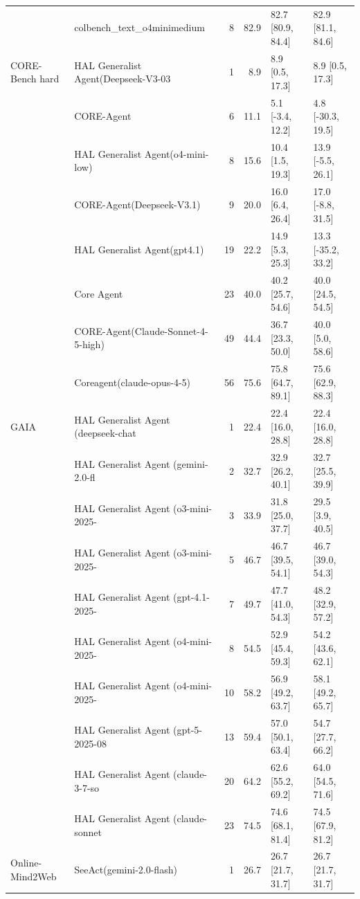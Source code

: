 \begin{longtable}{llrrll}
 & colbench\_text\_o4minimedium & 8 & 82.9 & 82.7 [80.9, 84.4] & 82.9 [81.1, 84.6] \\
CORE-Bench hard & HAL Generalist Agent(Deepseek-V3-03~ & 1 & 8.9 & 8.9 [0.5, 17.3] & 8.9 [0.5, 17.3] \\
 & CORE-Agent & 6 & 11.1 & 5.1 [-3.4, 12.2] & 4.8 [-30.3, 19.5] \\
 & HAL Generalist Agent(o4-mini-low) & 8 & 15.6 & 10.4 [1.5, 19.3] & 13.9 [-5.5, 26.1] \\
 & CORE-Agent(Deepseek-V3.1) & 9 & 20.0 & 16.0 [6.4, 26.4] & 17.0 [-8.8, 31.5] \\
 & HAL Generalist Agent(gpt4.1) & 19 & 22.2 & 14.9 [5.3, 25.3] & 13.3 [-35.2, 33.2] \\
 & Core Agent & 23 & 40.0 & 40.2 [25.7, 54.6] & 40.0 [24.5, 54.5] \\
 & CORE-Agent(Claude-Sonnet-4-5-high) & 49 & 44.4 & 36.7 [23.3, 50.0] & 40.0 [5.0, 58.6] \\
 & Coreagent(claude-opus-4-5) & 56 & 75.6 & 75.8 [64.7, 89.1] & 75.6 [62.9, 88.3] \\
GAIA & HAL Generalist Agent (deepseek-chat~ & 1 & 22.4 & 22.4 [16.0, 28.8] & 22.4 [16.0, 28.8] \\
 & HAL Generalist Agent (gemini-2.0-fl~ & 2 & 32.7 & 32.9 [26.2, 40.1] & 32.7 [25.5, 39.9] \\
 & HAL Generalist Agent (o3-mini-2025-~ & 3 & 33.9 & 31.8 [25.0, 37.7] & 29.5 [3.9, 40.5] \\
 & HAL Generalist Agent (o3-mini-2025-~ & 5 & 46.7 & 46.7 [39.5, 54.1] & 46.7 [39.0, 54.3] \\
 & HAL Generalist Agent (gpt-4.1-2025-~ & 7 & 49.7 & 47.7 [41.0, 54.3] & 48.2 [32.9, 57.2] \\
 & HAL Generalist Agent (o4-mini-2025-~ & 8 & 54.5 & 52.9 [45.4, 59.3] & 54.2 [43.6, 62.1] \\
 & HAL Generalist Agent (o4-mini-2025-~ & 10 & 58.2 & 56.9 [49.2, 63.7] & 58.1 [49.2, 65.7] \\
 & HAL Generalist Agent (gpt-5-2025-08~ & 13 & 59.4 & 57.0 [50.1, 63.4] & 54.7 [27.7, 66.2] \\
 & HAL Generalist Agent (claude-3-7-so~ & 20 & 64.2 & 62.6 [55.2, 69.2] & 64.0 [54.5, 71.6] \\
 & HAL Generalist Agent (claude-sonnet~ & 23 & 74.5 & 74.6 [68.1, 81.4] & 74.5 [67.9, 81.2] \\
Online-Mind2Web & SeeAct(gemini-2.0-flash) & 1 & 26.7 & 26.7 [21.7, 31.7] & 26.7 [21.7, 31.7] \\

\end{longtable}
